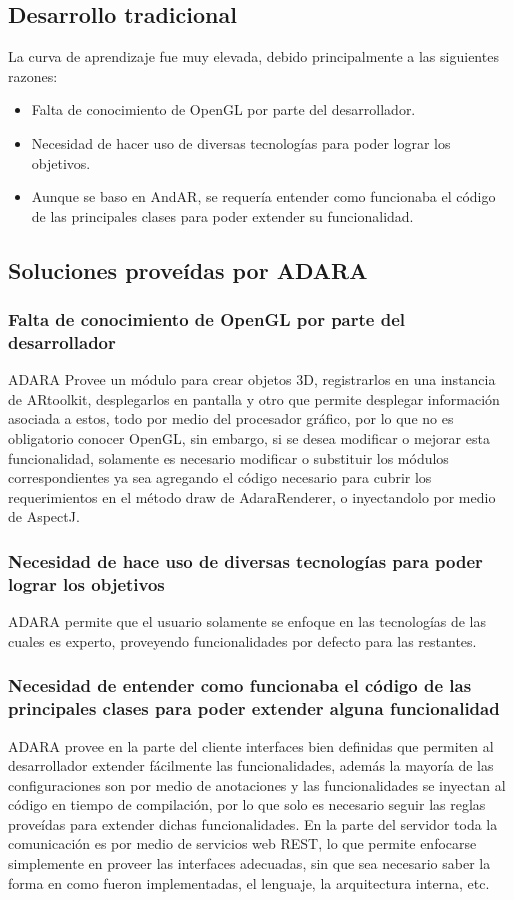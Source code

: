\documentclass[12pt,a4paper,spanish,openany]{book}
\begin{document}
\subsection{Desarrollo tradicional}
La curva de aprendizaje fue muy elevada, debido principalmente a las siguientes
razones:
\begin{itemize}
  \item Falta de conocimiento de OpenGL por parte del desarrollador.
  \item Necesidad de hacer uso de diversas tecnologías para poder lograr los
  objetivos.
  \item Aunque se baso en AndAR, se requería entender como funcionaba el código
  de las principales clases para poder extender su funcionalidad.

\end{itemize}

\subsection{Soluciones proveídas por ADARA}
\subsubsection{Falta de conocimiento de OpenGL por parte del desarrollador}
ADARA Provee un módulo para crear objetos 3D, registrarlos en una
instancia de ARtoolkit, desplegarlos en pantalla y otro que permite desplegar
información asociada a estos, todo por medio del procesador gráfico, por lo que
no es obligatorio conocer OpenGL, sin embargo, si se desea
modificar o mejorar esta funcionalidad, solamente es necesario modificar o
substituir los módulos correspondientes ya sea agregando el código
necesario para cubrir los requerimientos en el método draw de AdaraRenderer, o
inyectandolo por medio de AspectJ.

\subsubsection{Necesidad de hace uso de diversas tecnologías para poder lograr los
  objetivos}
  ADARA permite que el usuario solamente se enfoque en las tecnologías de las
  cuales es experto, proveyendo funcionalidades por defecto para las restantes.

\subsubsection{Necesidad de entender como funcionaba el código
  de las principales clases para poder extender alguna funcionalidad}
  ADARA provee en la parte del cliente interfaces bien definidas que
  permiten al desarrollador extender fácilmente las funcionalidades, además la
  mayoría de las configuraciones son por medio de anotaciones y las
  funcionalidades se inyectan al código en tiempo de compilación, por lo que
  solo es necesario seguir las reglas proveídas para extender dichas funcionalidades. En la parte del
  servidor toda la comunicación es por medio de servicios web REST, lo que permite enfocarse simplemente en proveer las interfaces adecuadas, sin que
  sea necesario saber la forma en como fueron implementadas, el lenguaje, la
  arquitectura interna, etc.
\end{document}

